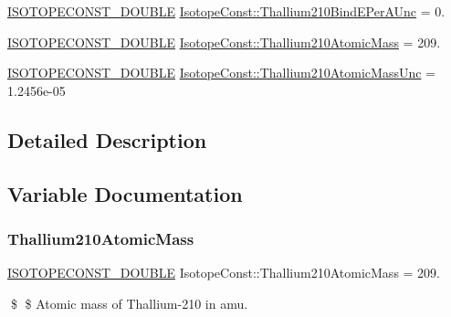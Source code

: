 \begin{DoxyCompactItemize}
\mbox{\hyperlink{group___isotope_const-_macros_ga8f45a7272ce02c0b4c65c44636ed719a}{I\+S\+O\+T\+O\+P\+E\+C\+O\+N\+S\+T\+\_\+\+D\+O\+U\+B\+LE}} \mbox{\hyperlink{group___isotope_const-_thallium-_tl210_ga985f43552ac2b2d40f5115d66ea78cd6}{Isotope\+Const\+::\+Thallium210\+Bind\+E\+Per\+A\+Unc}} = 0.
\item 
\mbox{\hyperlink{group___isotope_const-_macros_ga8f45a7272ce02c0b4c65c44636ed719a}{I\+S\+O\+T\+O\+P\+E\+C\+O\+N\+S\+T\+\_\+\+D\+O\+U\+B\+LE}} \mbox{\hyperlink{group___isotope_const-_thallium-_tl210_ga5b34156c7bb8b315c74c1e3a5cf18852}{Isotope\+Const\+::\+Thallium210\+Atomic\+Mass}} = 209.
\item 
\mbox{\hyperlink{group___isotope_const-_macros_ga8f45a7272ce02c0b4c65c44636ed719a}{I\+S\+O\+T\+O\+P\+E\+C\+O\+N\+S\+T\+\_\+\+D\+O\+U\+B\+LE}} \mbox{\hyperlink{group___isotope_const-_thallium-_tl210_ga3aa04292229942df184e906c2d7fdb8d}{Isotope\+Const\+::\+Thallium210\+Atomic\+Mass\+Unc}} = 1.\+2456e-\/05
\end{DoxyCompactItemize}


\subsection{Detailed Description}


\subsection{Variable Documentation}
\mbox{\label{group___isotope_const-_thallium-_tl210_ga5b34156c7bb8b315c74c1e3a5cf18852}} 
\subsubsection{\texorpdfstring{Thallium210\+Atomic\+Mass}{Thallium210AtomicMass}}
{\footnotesize\ttfamily \mbox{\hyperlink{group___isotope_const-_macros_ga8f45a7272ce02c0b4c65c44636ed719a}{I\+S\+O\+T\+O\+P\+E\+C\+O\+N\+S\+T\+\_\+\+D\+O\+U\+B\+LE}} Isotope\+Const\+::\+Thallium210\+Atomic\+Mass = 209.}

\$ \$ Atomic mass of Thallium-\/210 in amu. \mbox{\label{group___isotope_const-_thallium-_tl210_ga3aa04292229942df184e906c2d7fdb8d}} 
